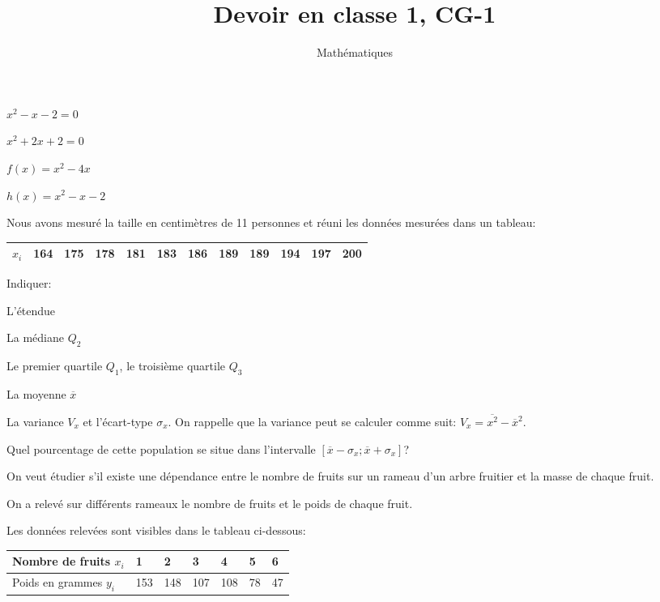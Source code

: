 \documentclass[a4paper,12pt]{scrartcl}
\date{}
\title{Devoir en classe 1, CG-1}
\author{Mathématiques}
\begin{document}
\maketitle


\question{}
$x^2-x-2=0$

\question{}
$x^2+2x+2=0$


\question{}
$f(x) = x^2 - 4x$

\question{}
$h(x) = x^2-x-2$


Nous avons mesuré la taille en centimètres de 11 personnes et réuni les données mesurées dans un tableau:

\begin{center}
\begin{tabular}{|l|l|l|l|l|l|l|l|l|l|l|l|}
\hline
$x_i$ & 164 & 175 & 178 & 181 & 183 & 186 & 189 & 189 & 194 & 197 & 200 \\ \hline
\end{tabular}
\end{center}

Indiquer:

\question{}
L'étendue

\question{}
La médiane $Q_2$

\question{}
Le premier quartile $Q_1$, le troisième quartile $Q_3$

\question{}
La moyenne $\overline{x}$

\question{}
La variance $V_x$ et l'écart-type $\sigma_x$. On rappelle que la variance peut se calculer comme suit: $V_x = \overline{x^2} - \overline{x}^2$.

\question{}
Quel pourcentage de cette population se situe dans l'intervalle $[\overline{x} - \sigma_x ; \overline{x} + \sigma_x]$?


On veut étudier s'il existe une dépendance entre le nombre de fruits sur un rameau d'un arbre fruitier et la masse de chaque fruit. 

On a relevé sur différents rameaux le nombre de fruits et le poids de chaque fruit. 

Les données relevées sont visibles dans le tableau ci-dessous:

\begin{center}
\begin{tabular}{|l|l|l|l|l|l|l|}
\hline
Nombre de fruits $x_i$       & 1   & 2   & 3   & 4   & 5  & 6  \\ \hline
Poids en grammes $y_i$ & 153 & 148 & 107 & 108 & 78 & 47 \\ \hline\end{tabular}
\end{center}
\end{document}
